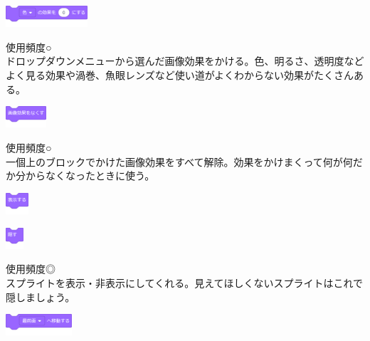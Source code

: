 \documentclass[b5paper,10pt]{jsarticle}
\begin{document}
\begin{multicols*}{3}
\begin{itembox}{9}
\includegraphics[height=8mm]{images/looks_12.png}
\end{itembox}
使用頻度○\\
ドロップダウンメニューから選んだ画像効果をかける。色、明るさ、透明度などよく見る効果や渦巻、魚眼レンズなど使い道がよくわからない効果がたくさんある。
\begin{itembox}{10}
\includegraphics[height=8mm]{images/looks_13.png}
\end{itembox}
使用頻度○\\
一個上のブロックでかけた画像効果をすべて解除。効果をかけまくって何が何だか分からなくなったときに使う。
\begin{itembox}{11}
\includegraphics[height=8mm]{images/looks_14.png}

\includegraphics[height=8mm]{images/looks_15.png}
\end{itembox}
使用頻度◎\\
スプライトを表示・非表示にしてくれる。見えてほしくないスプライトはこれで隠しましょう。
\begin{itembox}{12}
\includegraphics[height=8mm]{images/looks_16.png}


\end{itembox}
\end{multicols*}
\end{document}
